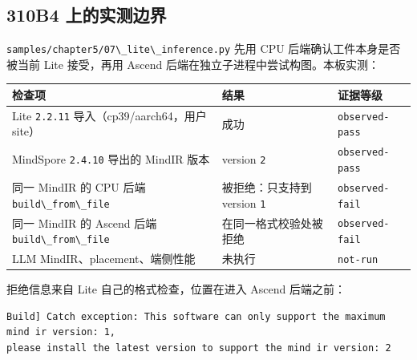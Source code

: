 \subsection{310B4 上的实测边界}\label{src-book-chapter5-h27}

\passthrough{\lstinline!samples/chapter5/07\_lite\_inference.py!} 先用
CPU 后端确认工件本身是否被当前 Lite 接受，再用 Ascend
后端在独立子进程中尝试构图。本板实测：

\begin{longtable}[]{@{}
  >{\raggedright\arraybackslash}p{}
  >{\raggedright\arraybackslash}p{}
  >{\raggedright\arraybackslash}p{}@{}}
\toprule\noalign{}
\begin{minipage}[b]{\linewidth}\raggedright
检查项
\end{minipage} & \begin{minipage}[b]{\linewidth}\raggedright
结果
\end{minipage} & \begin{minipage}[b]{\linewidth}\raggedright
证据等级
\end{minipage} \\
\midrule\noalign{}
\endhead
\bottomrule\noalign{}
\endlastfoot
Lite \passthrough{\lstinline!2.2.11!} 导入（cp39/aarch64，用户 site） &
成功 & \passthrough{\lstinline!observed-pass!} \\
MindSpore \passthrough{\lstinline!2.4.10!} 导出的 MindIR 版本 & version
\passthrough{\lstinline!2!} & \passthrough{\lstinline!observed-pass!} \\
同一 MindIR 的 CPU 后端 \passthrough{\lstinline!build\_from\_file!} &
被拒绝：只支持到 version \passthrough{\lstinline!1!} &
\passthrough{\lstinline!observed-fail!} \\
同一 MindIR 的 Ascend 后端 \passthrough{\lstinline!build\_from\_file!} &
在同一格式校验处被拒绝 & \passthrough{\lstinline!observed-fail!} \\
LLM MindIR、placement、端侧性能 & 未执行 &
\passthrough{\lstinline!not-run!} \\
\end{longtable}

拒绝信息来自 Lite 自己的格式检查，位置在进入 Ascend 后端之前：

\begin{lstlisting}
Build] Catch exception: This software can only support the maximum mind ir version: 1,
please install the latest version to support the mind ir version: 2
\end{lstlisting}

